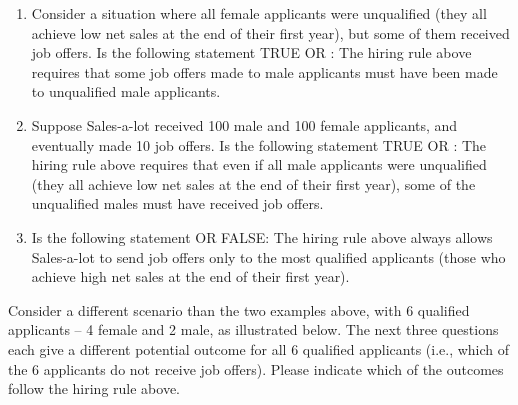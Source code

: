 \documentclass{article}
\newcommand{\correct}[1]{{\color{red}{#1}}}
\newcommand{\correct}[1]{{\color{red}{#1}}}
\begin{document}
\begin{enumerate}
\item Consider a situation where all female applicants were unqualified (they all achieve low net sales at the end of their first year), but some of them received job offers. Is the following statement TRUE OR \correct{FALSE}: The hiring rule above requires that some job offers made to male applicants must have been made to unqualified male applicants.

\item Suppose Sales-a-lot received 100 male and 100 female applicants, and eventually made 10 job offers. Is the following statement TRUE OR \correct{FALSE}: The hiring rule above requires that even if all male applicants were unqualified (they all achieve low net sales at the end of their first year), some of the unqualified males must have received job offers.

\item Is the following statement \correct{TRUE} OR FALSE: The hiring rule above always allows Sales-a-lot to send job offers only to the most qualified applicants (those who achieve high net sales at the end of their first year).

\end{enumerate}

Consider a different scenario than the two examples above, with 6 qualified applicants -- 4 female and 2 male, as illustrated below. The next three questions each give a different potential outcome for all 6 qualified applicants (i.e., which of the 6 applicants do not receive job offers). Please indicate which of the outcomes follow the hiring rule above.
\end{document}
